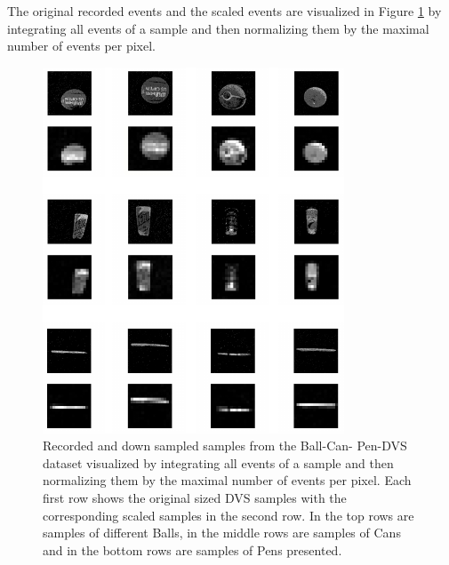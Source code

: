 The original recorded events and the scaled events are visualized in Figure \ref{fig:bcpdvsp} by integrating all events of a sample and then normalizing them by the maximal number of events per pixel.
 
\begin{figure}[h!]
	\centering
	\includegraphics[width=0.80\textwidth]{imgs/bcp/ds1.png} 
	\caption[Pen samples from the Ball-Can-Pen-DVS dataset.]{ Recorded and down sampled samples from the Ball-Can-	Pen-DVS dataset visualized by  integrating all events of a sample and then normalizing them by the maximal number of events per pixel. Each first row shows the original sized DVS samples with the corresponding scaled samples in the second row.
	In the top rows are samples of different Balls, in the middle rows are samples of Cans and in the bottom rows are samples of Pens presented.	
	}
	\label{fig:bcpdvsp}
\end{figure} 
 
 
